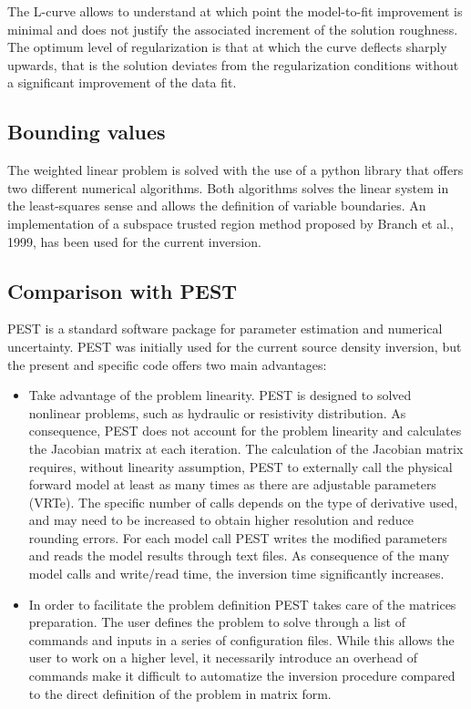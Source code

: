 \documentclass{article}
\begin{document}
The L-curve allows to understand at which point the model-to-fit improvement is minimal and does not justify the associated increment of the solution roughness. The optimum level of regularization is that at which the curve deflects sharply upwards, that is the solution deviates from the regularization conditions without a significant improvement of the data fit.

\subsection{Bounding values}

The weighted linear problem is solved with the use of a python library that offers two different numerical algorithms. Both algorithms solves the linear system in the least-squares sense and allows the definition of variable boundaries. An implementation of a subspace trusted region method proposed by Branch et al., 1999, has been used for the current inversion.

\subsection{Comparison with PEST}

PEST is a standard software package for parameter estimation and numerical uncertainty. PEST was initially used for the current source density inversion, but the present and specific code offers two main advantages:

\begin{itemize}
	\item Take advantage of the problem linearity. PEST is designed to solved nonlinear problems, such as hydraulic or resistivity distribution. As consequence, PEST does not account for the problem linearity and calculates the Jacobian matrix at each iteration. The calculation of the Jacobian matrix requires, without linearity assumption, PEST to externally call the physical forward model at least as many times as there are adjustable parameters (VRTe). The specific number of calls depends on the type of derivative used, and may need to be increased to obtain higher resolution and reduce rounding errors. For each model call PEST writes the modified parameters and reads the model results through text files. As consequence of the many model calls and write/read time, the inversion time significantly increases.
	\item  In order to facilitate the  problem definition PEST takes care of the matrices preparation. The user defines the problem to solve through a list of commands and inputs in a series of configuration files. While this allows the user to work on a higher level, it necessarily introduce an overhead of commands make it difficult to automatize the inversion procedure compared to the direct definition of the problem in matrix form.
\end{itemize}
\end{document}
